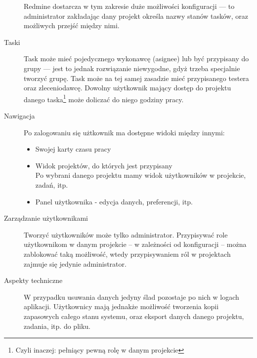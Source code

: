 \documentclass[a4paper,12pt,notitlepage]{mwrep}
\begin{document}
\begin{description}
		Redmine dostarcza w tym zakresie duże możliwości konfiguracji ---
		to administrator zakładając dany projekt określa nazwy stanów tasków, oraz możliwych przejść między nimi.
	\item[Taski]
		Task może mieć pojedycznego wykonawcę (asignee) lub być przypisany do grupy --- jest to jednak rozwiązanie niewygodne,
		gdyż trzeba specjalnie tworzyć grupę.
		Task może na tej samej zasadzie mieć przypisanego testera oraz zleceniodawcę.
		Dowolny użytkownik mający dostęp do projektu danego taska\footnote{Czyli inaczej: pełniący pewną rolę w danym projekcie}
		może doliczać do niego godziny pracy.
	\item[Nawigacja]
		Po zalogowaniu się użtkownik ma dostępne widoki między innymi:
		\begin{itemize}
			\item	Swojej karty czasu pracy
			\item	Widok projektów, do których jest przypisany\\
					Po wybrani danego projektu mamy widok użytkowników w projekcie, zadań, itp.
			\item	Panel użytkownika - edycja danych, preferencji, itp.
		\end{itemize}
	\item[Zarządzanie użytkownikami]
		Tworzyć użytkowników może tylko administrator. Przypisywać role użytkownikom w danym projekcie -- w zależności
		od konfiguracji -- można zablokować taką możliwość, wtedy przypisywaniem ról w projektach zajmuje się jedynie administrator.
	\item[Aspekty techniczne]
		W przypadku usuwania danych jedyny ślad pozostaje po nich w logach aplikacji.
		Użytkownicy mają jednakże możliwość tworzenia kopii zapasowych całego stanu systemu,
		oraz eksport danych danego projektu, zadania, itp. do pliku.
\end{description}
\end{document}
